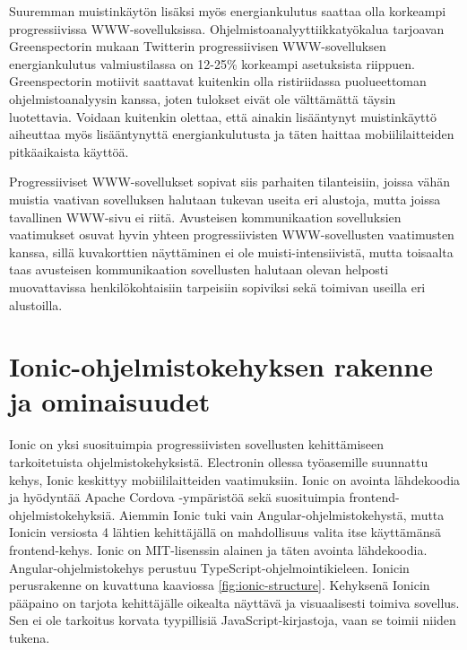 \documentclass[utf8]{gradu3}
\begin{document}
Suuremman muistinkäytön lisäksi myös energiankulutus saattaa olla korkeampi progressiivissa WWW-sovelluksissa. Ohjelmistoanalyyttiikkatyökalua tarjoavan Greenspectorin mukaan \parencite[]{pwa-power-usage} Twitterin progressiivisen WWW-sovelluksen energiankulutus valmiustilassa on 12-25\% korkeampi asetuksista riippuen. Greenspectorin motiivit saattavat kuitenkin olla ristiriidassa puolueettoman ohjelmistoanalyysin kanssa, joten tulokset eivät ole välttämättä täysin luotettavia. Voidaan kuitenkin olettaa, että ainakin lisääntynyt muistinkäyttö aiheuttaa myös lisääntynyttä energiankulutusta ja täten haittaa mobiililaitteiden pitkäaikaista käyttöä.

Progressiiviset WWW-sovellukset sopivat siis parhaiten tilanteisiin, joissa vähän muistia vaativan sovelluksen halutaan tukevan useita eri alustoja, mutta joissa tavallinen WWW-sivu ei riitä. Avusteisen kommunikaation sovelluksien vaatimukset osuvat hyvin yhteen progressiivisten WWW-sovellusten vaatimusten kanssa, sillä kuvakorttien näyttäminen ei ole muisti-intensiivistä, mutta toisaalta taas avusteisen kommunikaation sovellusten halutaan olevan helposti muovattavissa henkilökohtaisiin tarpeisiin sopiviksi sekä toimivan useilla eri alustoilla.

\section{Ionic-ohjelmistokehyksen rakenne ja ominaisuudet}

Ionic on yksi suosituimpia progressiivisten sovellusten kehittämiseen tarkoitetuista ohjelmistokehyksistä. Electronin ollessa työasemille suunnattu kehys, Ionic keskittyy mobiililaitteiden vaatimuksiin. Ionic on avointa lähdekoodia ja hyödyntää Apache Cordova -ympäristöä sekä suosituimpia frontend-ohjelmistokehyksiä. Aiemmin Ionic tuki vain Angular-ohjelmistokehystä, mutta Ionicin versiosta 4 lähtien kehittäjällä on mahdollisuus valita itse käyttämänsä frontend-kehys. Ionic on MIT-lisenssin alainen ja täten avointa lähdekoodia. Angular-ohjelmistokehys perustuu TypeScript-ohjelmointikieleen. Ionicin perusrakenne on kuvattuna kaaviossa \ref{fig:ionic-structure}. Kehyksenä Ionicin pääpaino on tarjota kehittäjälle oikealta näyttävä ja visuaalisesti toimiva sovellus. Sen ei ole tarkoitus korvata tyypillisiä JavaScript-kirjastoja, vaan se toimii niiden tukena. \parencite[]{ionic-documentation}
\end{document}
